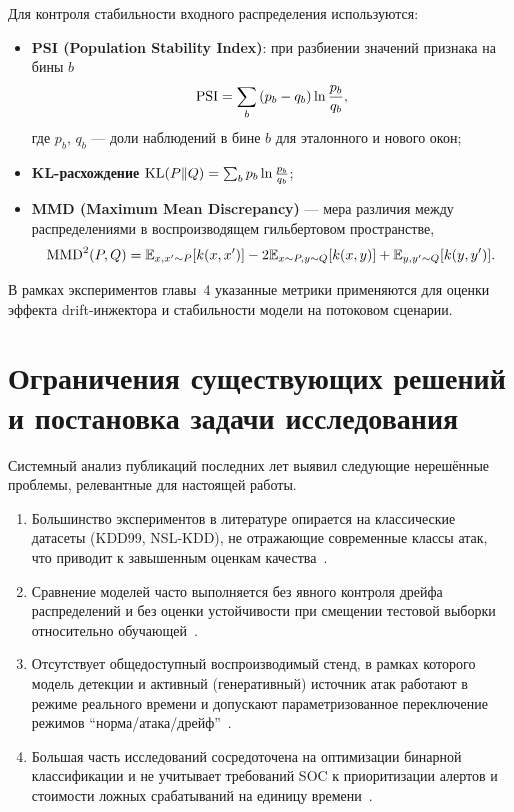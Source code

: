 Для контроля стабильности входного распределения используются:

\begin{itemize}
    \item \textbf{PSI (Population Stability Index)}: при разбиении значений
    признака на бины \(b\)
    \begin{equation}
    \operatorname{PSI} = \sum_{b}\,(p_b - q_b)\ln\frac{p_b}{q_b},
    \label{eq:psi}
    \end{equation}
    где \(p_b\), \(q_b\) --- доли наблюдений в бине \(b\) для эталонного и
    нового окон;
    \item \textbf{KL-расхождение}
    \(\operatorname{KL}(P\|Q) = \sum_b p_b \ln \tfrac{p_b}{q_b}\);
    \item \textbf{MMD (Maximum Mean Discrepancy)} --- мера различия между
    распределениями в воспроизводящем гильбертовом пространстве,
    \begin{equation}
    \operatorname{MMD}^{2}(P, Q) =
    \mathbb{E}_{x,x'\sim P}[k(x,x')] - 2\mathbb{E}_{x\sim P, y\sim Q}[k(x,y)]
    + \mathbb{E}_{y,y'\sim Q}[k(y,y')].
    \label{eq:mmd}
    \end{equation}
\end{itemize}

В рамках экспериментов главы~4 указанные метрики применяются для оценки
эффекта drift-инжектора и стабильности модели на потоковом сценарии.

\section{Ограничения существующих решений и постановка задачи исследования}

Системный анализ публикаций последних лет выявил следующие нерешённые
проблемы, релевантные для настоящей работы.

\begin{enumerate}
    \item Большинство экспериментов в литературе опирается на классические
    датасеты (KDD99, NSL-KDD), не отражающие современные классы атак, что
    приводит к завышенным оценкам качества~\cite{tavallaee2009nslkdd,
    moustafa2016eval, sommer2010outside, gharib2016evalframework}.
    \item Сравнение моделей часто выполняется без явного контроля дрейфа
    распределений и без оценки устойчивости при смещении тестовой выборки
    относительно обучающей~\cite{pendlebury2019tesseract,
    andresini2021insomnia}.
    \item Отсутствует общедоступный воспроизводимый стенд, в рамках которого
    модель детекции и активный (генеративный) источник атак работают в режиме
    реального времени и допускают параметризованное переключение режимов
    ``норма/атака/дрейф''~\cite{ring2019flowgan, apruzzese2020adversarial}.
    \item Большая часть исследований сосредоточена на оптимизации бинарной
    классификации и не учитывает требований SOC к приоритизации алертов и
    стоимости ложных срабатываний на единицу времени~\cite{sommer2010outside}.
\end{enumerate}

